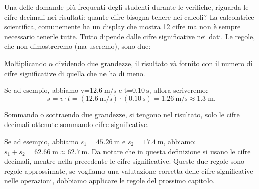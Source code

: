 Una delle domande più frequenti degli studenti durante le verifiche, riguarda le cifre decimali nei risultati: quante cifre bisogna tenere nei calcoli? La calcolatrice scientifica, comunemente ha un display che mostra 12 cifre ma non è sempre necessario tenerle tutte. Tutto dipende dalle cifre significative nei dati. Le regole, che non dimostreremo (ma useremo), sono due:
\begin{csp}
Moltiplicando o dividendo due grandezze, il risultato và fornito con il numero di cifre significative di quella che ne ha di meno.
\end{csp}
Se ad esempio, abbiamo v=$\SI{12,6}{\meter\per\second}$ e t=$\SI{0,10}{\second}$, allora scriveremo:
\[
s=v\cdot t =  \left(\SI{12,6}{\meter\per\second} \right)\cdot\left( \SI{0,10}{\second}\right) = \SI{1,26}{\meter\per\second} \approx \SI{1,3}{\meter}. 
\]
\begin{css}
Sommando o sottraendo due grandezze, si tengono nel risultato, solo le cifre decimali ottenute sommando cifre significative.
\end{css}
Se ad esempio, abbiamo $s_1=\SI{45,26}{\meter}$ e $s_2=\SI{17,4}{\meter}$, abbiamo: $s_1 +s_2 = \SI{62,66}{\meter} \approx \SI{62,7}{\meter}$. Da notare che in questa definizione si usano le cifre decimali, mentre nella precedente le cifre significative. Queste due regole sono regole approssimate, se vogliamo una valutazione corretta delle cifre significative nelle operazioni, dobbiamo applicare le regole del prossimo capitolo.

